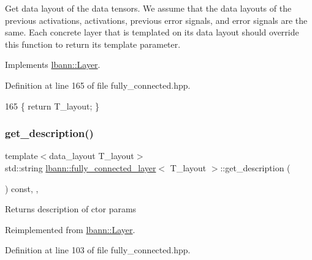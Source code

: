 Get data layout of the data tensors. We assume that the data layouts of the previous activations, activations, previous error signals, and error signals are the same. Each concrete layer that is templated on its data layout should override this function to return its template parameter. 

Implements \hyperlink{classlbann_1_1Layer_a5dfb66e81fc085997402a5e2241316bd}{lbann\+::\+Layer}.



Definition at line 165 of file fully\+\_\+connected.\+hpp.


\begin{DoxyCode}
165 \{ \textcolor{keywordflow}{return} T\_layout; \}
\end{DoxyCode}
\mbox{\label{classlbann_1_1fully__connected__layer_a7ce678ec7560dd145244ffd8813d5edb}} 
\subsubsection{\texorpdfstring{get\+\_\+description()}{get\_description()}}
{\footnotesize\ttfamily template$<$data\+\_\+layout T\+\_\+layout$>$ \\
std\+::string \hyperlink{classlbann_1_1fully__connected__layer}{lbann\+::fully\+\_\+connected\+\_\+layer}$<$ T\+\_\+layout $>$\+::get\+\_\+description (\begin{DoxyParamCaption}{ }\end{DoxyParamCaption}) const\hspace{0.3cm}{\ttfamily [inline]}, {\ttfamily [override]}, {\ttfamily [virtual]}}

Returns description of ctor params 

Reimplemented from \hyperlink{classlbann_1_1Layer_acc0803d3428914ca1eb5988c4309174a}{lbann\+::\+Layer}.



Definition at line 103 of file fully\+\_\+connected.\+hpp.


